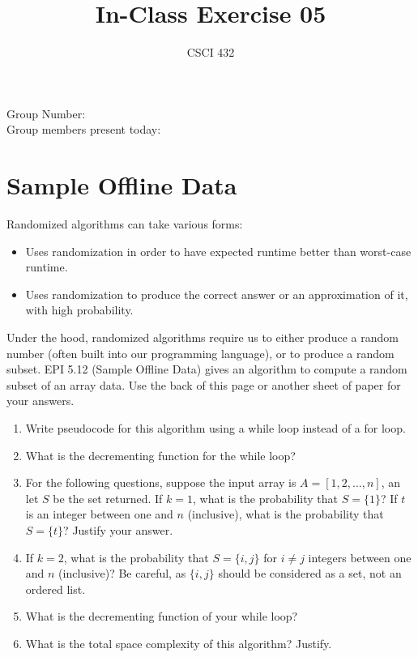 \documentclass{article}
\title{In-Class Exercise 05}
\author{CSCI 432}
\begin{document}
\maketitle

\noindent
Group Number:\\
Group members present today:

\section*{Sample Offline Data}
Randomized algorithms can take various forms:
\begin{itemize}
    \item Uses randomization in order to have expected runtime better than
        worst-case runtime.
    \item Uses randomization to produce the correct answer or an approximation
        of it, with high
        probability.
\end{itemize}
Under the hood, randomized algorithms require us to either produce a random
number (often built into our programming language), or to produce a random
subset.  EPI 5.12 (Sample Offline Data) gives an algorithm to compute a random
subset of an array data.  Use the back of this page or another sheet of paper
for your answers.

\begin{enumerate}
    \item Write pseudocode for this algorithm using a while loop instead of a
        for loop.
    \item What is the decrementing function for the while loop?
    \item For the following questions, suppose the input array is
        $A=[1,2,\ldots,n]$, an let $S$ be the set
        returned. If $k=1$, what is the probability that $S=\{1\}$?  If $t$ is
        an integer between one and $n$ (inclusive), what is the
        probability that $S=\{t\}$?  Justify your answer.
    \item If $k=2$, what is the probability that $S=\{i,j\}$ for $i \neq j$
        integers between one and $n$ (inclusive)? Be careful, as
        $\{i,j\}$ should be considered as a set, not an ordered list.
    \item What is the decrementing function of your while loop?
    \item What is the total space complexity of this algorithm? Justify.
\end{enumerate}
\end{document}
